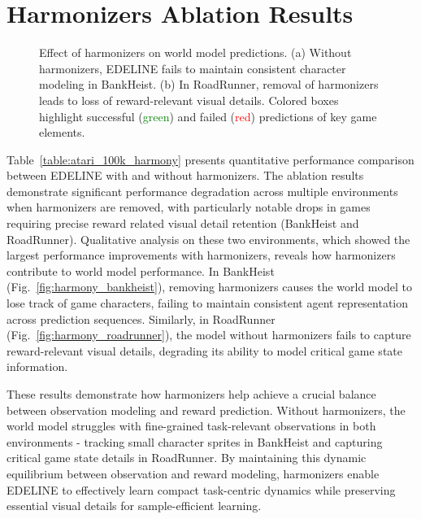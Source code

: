 \section{Harmonizers Ablation Results}
\label{appendix:harmony_ablation}

\begin{figure}[h]
\centering
{}
\caption{Effect of harmonizers on world model predictions. (a) Without harmonizers, EDELINE fails to maintain consistent character modeling in BankHeist. (b) In RoadRunner, removal of harmonizers leads to loss of reward-relevant visual details. Colored boxes highlight successful (\textcolor{green}{green}) and failed (\textcolor{red}{red}) predictions of key game elements.}
\label{fig:harmony_qualitative}
\end{figure}



Table~\ref{table:atari_100k_harmony} presents quantitative performance comparison between EDELINE with and without harmonizers. The ablation results demonstrate significant performance degradation across multiple environments when harmonizers are removed, with particularly notable drops in games requiring precise reward related visual detail retention (BankHeist and RoadRunner). Qualitative analysis on these two environments, which showed the largest performance improvements with harmonizers, reveals how harmonizers contribute to world model performance. In BankHeist (Fig.~\ref{fig:harmony_bankheist}), removing harmonizers causes the world model to lose track of game characters, failing to maintain consistent agent representation across prediction sequences. Similarly, in RoadRunner (Fig.~\ref{fig:harmony_roadrunner}), the model without harmonizers fails to capture reward-relevant visual details, degrading its ability to model critical game state information.

These results demonstrate how harmonizers help achieve a crucial balance between observation modeling and reward prediction. Without harmonizers, the world model struggles with fine-grained task-relevant observations in both environments - tracking small character sprites in BankHeist and capturing critical game state details in RoadRunner. By maintaining this dynamic equilibrium between observation and reward modeling, harmonizers enable EDELINE to effectively learn compact task-centric dynamics while preserving essential visual details for sample-efficient learning.